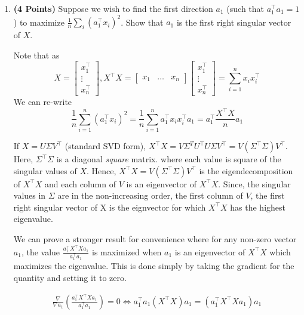 \documentclass[a4paper]{article}
\theoremstyle{definition}
\newenvironment{soln}{
    \leavevmode\color{blue}\ignorespaces
}{}
\begin{document}
\begin{enumerate}

\item  \textbf{(4 Points)}
Suppose we wish to find the first direction $a_1$ (such that $a_1^\top a_1 = 1$) to maximize $\frac{1}{n} \sum_i (a_1^\top x_i)^2$.
Show that $a_1$ is the first right singular vector of $X$.

\begin{soln}
    Note that as
    \begin{equation*}
    X = \begin{bmatrix} x_1^\top \\ \vdots \\ x_n^\top \end{bmatrix}, X^\top X = \begin{bmatrix} x_1 & \ldots & x_n \end{bmatrix} \begin{bmatrix} x_1^\top \\ \vdots \\ x_n^\top \end{bmatrix} = \sum\limits_{i = 1}^{n} x_i x_i^\top
    \end{equation*}
    We can re-write
    \begin{equation*}
        \frac{1}{n} \sum\limits_{i = 1}^{n} (a_1^\top x_i)^2 = \frac{1}{n} \sum\limits_{i = 1}^{n} a_1^\top x_i x_i^\top a_1 = a_1^\top \frac{X^\top X}{n} a_1
    \end{equation*}

    If $X = U \Sigma V^\top$ (standard SVD form), $X^\top X = V \Sigma^T U^\top U \Sigma V^\top = V (\Sigma^\top \Sigma) V^\top$. Here, $\Sigma^\top \Sigma$ is a diagonal \emph{square} matrix. where each value is square of the singular values of $X$. Hence, $X^\top X = V (\Sigma^\top \Sigma) V^\top$ is the eigendecomposition of $X^\top X$ and each column of $V$ is an eigenvector of $X^\top X$. Since, the singular values in $\Sigma$ are in the non-increasing order, the first column of $V$, the first right singular vector of X is the eignvector for which $X^\top X$ has the highest eigenvalue.

    We can prove a stronger result for convenience where for any non-zero vector $a_1$, the value $\frac{a_1^\top X^\top X a_1}{a_1^\top a_1}$ is maximized when $a_1$ is an eigenvector of $X^\top X$ which maximizes the eigenvalue. This is done simply by taking the gradient for the quantity and setting it to zero.

    \begin{align*}
        \frac{\nabla}{\nabla a_1} \left( \frac{a_1^\top X^\top X a_1}{a_1^\top a_1} \right) = 0 \iff a_1^\top a_1 (X^\top X) a_1 = ( a_1^\top X^\top X a_1 ) a_1
    \end{align*}


\end{soln}
\end{enumerate}
\end{document}
